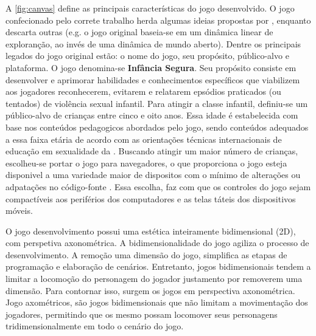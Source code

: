 \vspace{-0.2cm}

A \autoref{fig:canvas} define as principais características do jogo desenvolvido. O jogo confecionado pelo correte trabalho herda algumas ideias propostas por , enquanto descarta outras (e.g. o jogo original baseia-se em um dinâmica linear de exploranção, ao invés de uma dinâmica de mundo aberto). Dentre os principais legados do jogo original estão: o nome do jogo, seu propósito, público-alvo e plataforma. O jogo denomina-se \textbf{Infância Segura}. Seu propósito consiste em desenvolver e aprimorar habilidades e conhecimentos específicos que viabilizem aos jogadores reconhecerem, evitarem e relatarem epsódios praticados (ou tentados) de violência sexual infantil. Para atingir a classe infantil, definiu-se um público-alvo de crianças entre cinco e oito anos. Essa idade é estabelecida com base nos conteúdos pedagogicos abordados pelo jogo, sendo conteúdos adequados a essa faixa etária de acordo com as orientações técnicas internacionais de educação em sexualidade da . Buscando atingir um maior número de crianças, escolheu-se portar o jogo para navegadores, o que proporciona o jogo esteja disponivel a uma variedade maior de dispositos com o mínimo de alterações ou adpatações no código-fonte \cite{carrara2018criancca}. Essa escolha, faz com que os controles do jogo sejam compactíveis aos periférios dos computadores e as telas táteis dos dispositivos móveis. 






O jogo desenvolvimento possui uma estética inteiramente bidimensional (2D), com perspetiva axonométrica. A bidimensionalidade do jogo agiliza o processo de desenvolvimento. A remoção uma dimensão do jogo, simplifica as etapas de programação e elaboração de cenários. Entretanto, jogos bidimensionais tendem a limitar a locomoção do personagem do jogador justamento por removerem uma dimensão. Para contornar isso, surgem os jogos em perspectiva axonométrica. Jogo axométricos, são jogos bidimensionais que não limitam a movimentação dos jogadores, permitindo que os mesmo possam locomover seus personagens tridimensionalmente em todo o cenário do jogo. 


